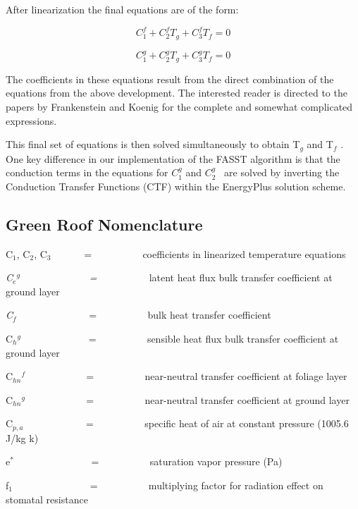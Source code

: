After linearization the final equations are of the form:

\begin{equation}
C_1^f + C_2^f{T_g} + C_3^f{T_f} = 0
\end{equation}

\begin{equation}
C_1^g + C_2^g{T_g} + C_3^g{T_f} = 0
\end{equation}

The coefficients in these equations result from the direct combination of the equations from the above development. The interested reader is directed to the papers by Frankenstein and Koenig for the complete and somewhat complicated expressions.

This final set of equations is then solved simultaneously to obtain T\emph{\(_{g}\)} and T\emph{\(_{f}\)} . One key difference in our implementation of the FASST algorithm is that the conduction terms in the equations for \(C_1^g\) and \(C_2^g\) ~are solved by inverting the Conduction Transfer Functions (CTF) within the EnergyPlus solution scheme.

\subsection{Green Roof Nomenclature}\label{green-roof-nomenclature}

C\(_{1}\), C\(_{2}\), C\(_{3}\)~~~~~~ = ~~~~~~~~~ coefficients in linearized temperature equations

\emph{C\(_{e}\)\(^{g}\)~~~~~~~~~~~~~ = ~~~~~~~~~} latent heat flux bulk transfer coefficient at ground layer

\emph{C\(_{f}\)~~ ~~~~~~~~~~~} = ~~~~~~~~~ bulk heat transfer coefficient

C\(_{h}\)\(^{g}\)~~~~~~~~~~~~~ = ~~~~~~~~~ sensible heat flux bulk transfer coefficient at ground layer

C\(_{hn}\)\(^{f}\) ~~~~~~~~~~~ = ~~~~~~~~~ near-neutral transfer coefficient at foliage layer

C\(_{hn}\)\(^{g}\) ~~~~~~~~~~~ = ~~~~~~~~~ near-neutral transfer coefficient at ground layer

C\(_{p,a}\)~~~~~~~~~~~~ = ~~~~~~~~~ specific heat of air at constant pressure (1005.6 J/kg k)

e\(^{*}\)~~~~~~~~~~~~~~~ = ~~~~~~~~~ saturation vapor pressure (Pa)

f\(_{1}\)~~~~~~~~~~~~~~~ = ~~~~~~~~~ multiplying factor for radiation effect on stomatal resistance

